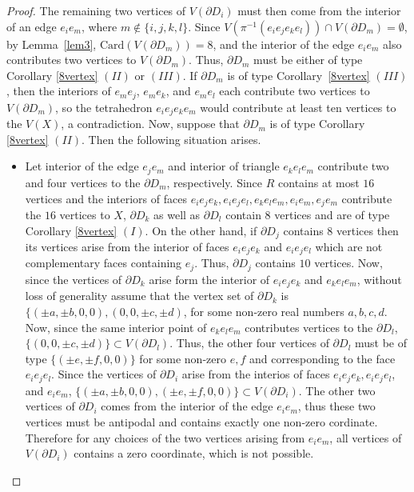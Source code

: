 \documentclass[11pt]{amsart}
\numberwithin{equation}{section}
\theoremstyle{definition}
\begin{document}
\begin{proof}
The remaining two vertices of $V(\partial D_i)$ must then come from the interior of an edge $e_i e_m$, where $m \notin  \{i,j,k,l\}$.  Since $V(\pi^{-1}(e_ie_je_ke_l))\cap V(\partial D_m)=\emptyset$, by Lemma~\ref{lem3}, $\mathrm{Card}(V(\partial D_m)) = 8$, and the interior of the edge $e_i e_m$ also contributes two vertices to $V(\partial D_m)$.  Thus, $\partial D_m$ must be either of type Corollary \ref{8vertex} $(II)$ or $(III)$. 
If $\partial D_m$ is of type  Corollary~\ref{8vertex} $(III)$, then the interiors of $e_m e_j$, $e_m e_k$, and $e_m e_l$ each contribute two vertices to $V(\partial D_m)$, so the tetrahedron $e_i e_j e_k e_m$ would contribute at least ten vertices to the $V(X)$, a contradiction. Now, suppose that $\partial D_m$ is of type   Corollary \ref{8vertex} $(II)$. Then the following situation arises.
\begin{itemize}
\item Let interior of the edge $e_je_m$ and interior of triangle $e_ke_le_m$ contribute two and four vertices to the $\partial D_m$, respectively. Since $R$ contains at most $16$ vertices and the interiors of faces $e_ie_je_k,e_ie_je_l,e_ke_le_m,e_ie_m,e_je_m$ contribute the $16$ vertices to $X$, $\partial D_k$ as well as $\partial D_l$ contain $8$ vertices and are of type Corollary \ref{8vertex} $(I)$. On the other hand, if $\partial D_j$ contains $8$ vertices then its vertices arise from the interior of faces $e_ie_je_k$ and $e_ie_je_l$  which are not complementary faces containing $e_j$. Thus, $\partial D_j$ contains  $10$ vertices. Now, since the vertices of $\partial D_k$ arise form the interior of $e_ie_je_k$ and $e_ke_le_m$, without loss of generality assume that the vertex set of $\partial D_k$ is $\{(\pm a,\pm b,0,0),(0,0,\pm c,\pm d)$, for some non-zero real numbers $a,b,c,d$. Now, since the same interior point of $e_ke_le_m$ contributes vertices to the $\partial D_l$, $\{(0,0,\pm c,\pm d)\}\subset  V(\partial D_l)$. Thus, the other four vertices of $\partial D_l$ must be of type $\{(\pm e, \pm f,0,0)\}$ for some non-zero $e,f$ and corresponding to the face $e_ie_je_l$. Since the vertices of $\partial D_i$ arise from the interios of faces $e_ie_je_k,e_ie_je_l$, and $e_ie_m$, $\{(\pm a,\pm b,0,0),(\pm e, \pm f,0,0) \}\subset V(\partial D_i)$. The other two vertices of $\partial D_i$ comes from the interior of the edge $e_ie_m$, thus these two vertices must be antipodal and contains exactly one non-zero cordinate. Therefore for any choices of the two vertices arising from $e_ie_m$, all vertices of $V(\partial D _i)$ contains a zero coordinate, which is not possible. 


\end{itemize}
\end{proof}
\end{document}
